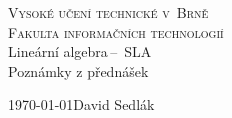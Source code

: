 \documentclass[a4paper, 11pt]{article}
\begin{document}
\begin{titlepage}

	\begin{center}
		\textsc{\Huge Vysoké učení technické v~Brně}\\
				  \huge{\textsc{Fakulta informačních technologií}}\\
		{\LARGE 	Lineární algebra\,--\, SLA}\\
				{\Huge Poznámky z přednášek}
	\end{center}
	{\Large\today \hfill David Sedlák}

\end{titlepage}

\tableofcontents






\newpage

\def\refname{Reference}

\end{document}
